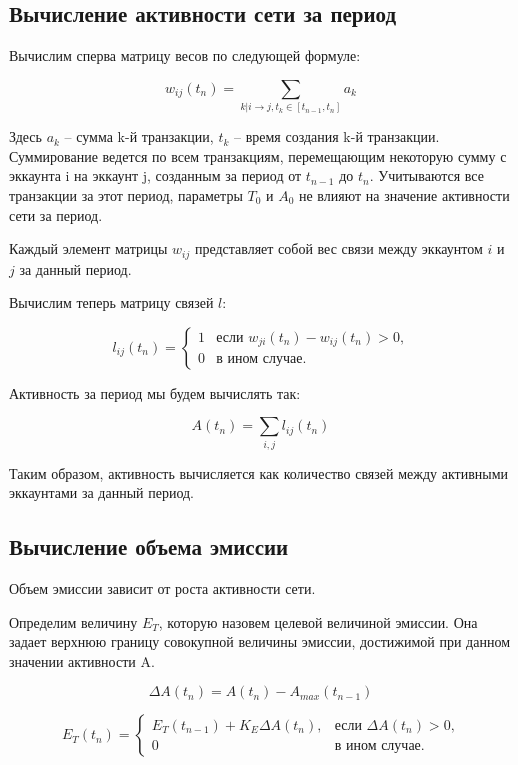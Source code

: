 \documentclass[a4paper,12pt]{article}
\begin{document}
\subsection{Вычисление активности сети за период}

Вычислим сперва матрицу весов по следующей формуле:

$$
w_{ij}(t_n)=\sum_{k|i \to j, t_k \in [t_{n-1}, t_n]}a_k
$$

Здесь $a_k$ – сумма k-й транзакции, $t_k$ – время создания k-й транзакции. Суммирование ведется по всем транзакциям, перемещающим некоторую сумму с эккаунта i на эккаунт j, созданным за период от $t_{n-1}$ до $t_n$. Учитываются все транзакции за этот период, параметры $T_0$ и $A_0$ не влияют на значение активности сети за период.

Каждый элемент матрицы $w_{ij}$ представляет собой вес связи между эккаунтом $i$ и $j$ за данный период.

Вычислим теперь матрицу связей $l$:

$$
l_{ij}(t_n) = \begin{cases}
 1
 & \text{если $w_{ji}(t_n)-w_{ij}(t_n) > 0$,}\\
 0 & \text{в ином случае.}
\end{cases}
$$

Активность за период мы будем вычислять так:

$$
A(t_n) = \sum_{i,j} l_{ij}(t_n)
$$

Таким образом, активность вычисляется как количество связей между активными эккаунтами за данный период.

\subsection{Вычисление объема эмиссии}

Объем эмиссии зависит от роста активности сети.

Определим величину $E_T$, которую назовем целевой величиной эмиссии. Она задает верхнюю границу совокупной величины эмиссии, достижимой при данном значении активности A.

$$
\Delta A(t_n) = A(t_n) - A_{max}(t_{n-1})
$$

$$
E_T(t_n) = \begin{cases}
 E_T(t_{n-1}) + K_E \Delta A(t_n),
 & \text{если $\Delta A(t_n) > 0$,}\\
 0 & \text{в ином случае.}
\end{cases}
$$
\end{document}
